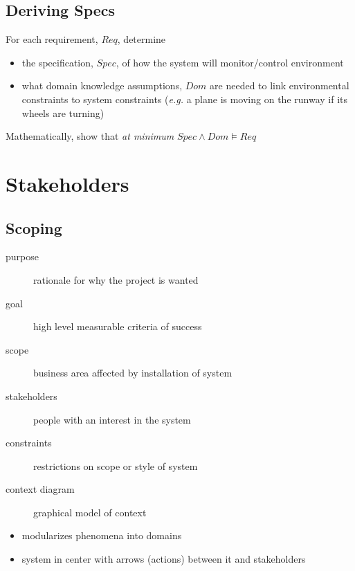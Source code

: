 \documentclass[]{article}
\theoremstyle{definition}
\begin{document}
	\subsection{Deriving Specs}
	For each requirement, $Req$, determine
	\begin{itemize}
		\item the specification, $Spec$, of how the system will monitor/control environment
		\item what domain knowledge assumptions, $Dom$ are needed to link environmental constraints to system constraints (\textit{e.g.} a plane is moving on the runway if its wheels are turning)
	\end{itemize}
	Mathematically, show that \textit{at minimum} $Spec \wedge Dom \models Req$


	\section{Stakeholders}
	\subsection{Scoping}
	\begin{description}
		\item[purpose] rationale for why the project is wanted
		\item[goal] high level measurable criteria of success
		\item[scope] business area affected by installation of system
		\item[stakeholders] people with an interest in the system
		\item[constraints] restrictions on scope or style of system
		\item[context diagram] graphical model of context
	\end{description}
	\begin{itemize}
		\item modularizes phenomena into domains
		\item system in center with arrows (actions) between it and stakeholders
	\end{itemize}
\end{document}

